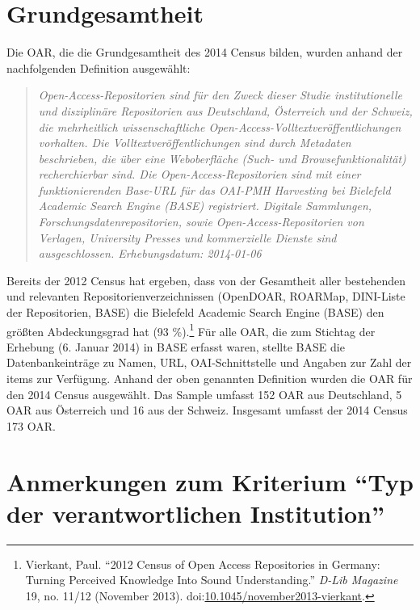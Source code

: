 \documentclass[a4paper,
fontsize=11pt,
oneside,
numbers=noperiodatend,
parskip=half-,
bibliography=totoc,
final
]{scrartcl}
\begin{document}
\section*{Grundgesamtheit}\label{grundgesamtheit}

Die OAR, die die Grundgesamtheit des 2014 Census bilden, wurden anhand
der nachfolgenden Definition ausgewählt:

\begin{quote}
\emph{Open-Access-Repositorien sind für den Zweck dieser Studie
institutionelle und disziplinäre Repositorien aus Deutschland,
Österreich und der Schweiz, die mehrheitlich wissenschaftliche
Open-Access-Volltextveröffentlichungen vorhalten. Die
Volltextveröffentlichungen sind durch Metadaten beschrieben, die über
eine Weboberfläche (Such- und Browsefunktionalität) recherchierbar sind.
Die Open-Access-Repositorien sind mit einer funktionierenden Base-URL
für das OAI-PMH Harvesting bei Bielefeld Academic Search Engine (BASE)
registriert. Digitale Sammlungen, Forschungsdatenrepositorien, sowie
Open-Access-Repositorien von Verlagen, University Presses und
kommerzielle Dienste sind ausgeschlossen. Erhebungsdatum: 2014-01-06}
\end{quote}

Bereits der 2012 Census hat ergeben, dass von der Gesamtheit aller
bestehenden und relevanten Repositorienverzeichnissen (OpenDOAR,
ROARMap, DINI-Liste der Repositorien, BASE) die Bielefeld Academic
Search Engine (BASE) den größten Abdeckungsgrad hat (93 \%).\footnote{Vierkant,
  Paul. \enquote{2012 Census of Open Access Repositories in Germany:
  Turning Perceived Knowledge Into Sound Understanding.} \emph{D-Lib
  Magazine} 19, no. 11/12 (November 2013).
  doi:\href{http://doi.org/10.1045/november2013-vierkant}{10.1045/november2013-vierkant}.}
Für alle OAR, die zum Stichtag der Erhebung (6. Januar 2014) in BASE
erfasst waren, stellte BASE die Datenbankeinträge zu Namen, URL,
OAI-Schnittstelle und Angaben zur Zahl der items zur Verfügung. Anhand
der oben genannten Definition wurden die OAR für den 2014 Census
ausgewählt. Das Sample umfasst 152 OAR aus Deutschland, 5 OAR aus
Österreich und 16 aus der Schweiz. Insgesamt umfasst der 2014 Census 173
OAR.

\section*{Anmerkungen zum Kriterium \enquote{Typ der
verantwortlichen
Institution}}\label{anmerkungen-zum-kriterium-typ-der-verantwortlichen-institution}
\end{document}

